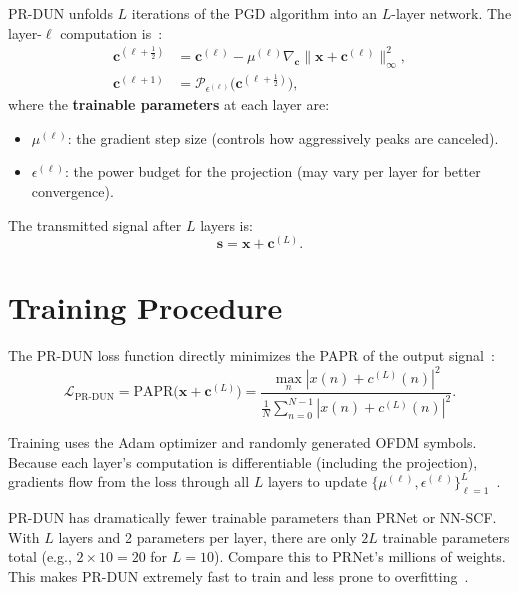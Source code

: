PR-DUN unfolds $L$ iterations of the PGD algorithm into an $L$-layer
network.  The layer-$\ell$ computation is~\cite{nguyen2022deep}:
\begin{align}
    \bm{c}^{(\ell+\frac{1}{2})}
    &= \bm{c}^{(\ell)} - \mu^{(\ell)}
    \nabla_{\bm{c}}\bigl\|\bm{x} + \bm{c}^{(\ell)}\bigr\|_\infty^2,
    \label{eq:prdun_layer_grad} \\[6pt]
    \bm{c}^{(\ell+1)}
    &= \mathcal{P}_{\epsilon^{(\ell)}}\!\bigl(\bm{c}^{(\ell+\frac{1}{2})}\bigr),
    \label{eq:prdun_layer_proj}
\end{align}
where the \textbf{trainable parameters} at each layer are:
\begin{itemize}
    \item $\mu^{(\ell)}$: the gradient step size (controls how aggressively
          peaks are canceled).
    \item $\epsilon^{(\ell)}$: the power budget for the projection
          (may vary per layer for better convergence).
\end{itemize}

The transmitted signal after $L$ layers is:
\begin{equation}
    \bm{s} = \bm{x} + \bm{c}^{(L)}.
    \label{eq:prdun_output}
\end{equation}


\section{Training Procedure}
\label{sec:prdun_training}

The PR-DUN loss function directly minimizes the PAPR of the output
signal~\cite{nguyen2022deep}:
\begin{equation}
    \mathcal{L}_{\mathrm{PR\text{-}DUN}}
    = \mathrm{PAPR}\bigl(\bm{x} + \bm{c}^{(L)}\bigr)
    = \frac{\max_n|x(n) + c^{(L)}(n)|^2}
           {\frac{1}{N}\sum_{n=0}^{N-1}|x(n) + c^{(L)}(n)|^2}.
    \label{eq:prdun_loss}
\end{equation}

Training uses the Adam optimizer and randomly generated OFDM symbols.
Because each layer's computation is differentiable (including the projection),
gradients flow from the loss through all $L$ layers to update
$\{\mu^{(\ell)}, \epsilon^{(\ell)}\}_{\ell=1}^{L}$~\cite{nguyen2022deep}.

\begin{keyinsight}
    PR-DUN has dramatically fewer trainable parameters than PRNet or NN-SCF.
    With $L$ layers and 2 parameters per layer, there are only $2L$
    trainable parameters total (e.g., $2 \times 10 = 20$ for $L=10$).
    Compare this to PRNet's millions of weights.  This makes PR-DUN
    extremely fast to train and less prone to overfitting~\cite{nguyen2022deep}.
\end{keyinsight}


